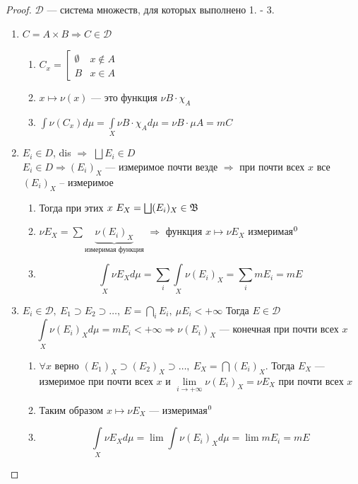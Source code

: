 \documentclass[english]{article}
\theoremstyle{plain}
\theoremstyle{remark}
\theoremstyle{definition}
\begin{document}
\begin{proof}
\(\mathcal{D}\) --- система множеств, для которых выполнено 1. - 3. 
\begin{enumerate}
\item \(C = A\times B \Rightarrow C \in \mathcal{D}\)
\begin{enumerate}
\item \(C_x = \left[\begin{matrix} \emptyset & x \not\in A \\ B & x \in A\end{matrix}\right.\)
\item \(x \mapsto \nu(x)\) --- это функция \(\nu B \cdot \chi_A\)
\item \(\int \nu(C_x) d\mu = \int\limits_X \nu B \cdot \chi_A d\mu = \nu B \cdot \mu A = mC\)
\end{enumerate}
\item \(E_i \in D\), dis \(\Rightarrow\) \(\bigsqcup E_i \in D\) \\
\(E_i \in D \Rightarrow (E_i)_X\) --- измеримое почти везде \(\Rightarrow\) при почти всех \(x\) все \((E_i)_X\) -- измеримое \\
\begin{enumerate}
\item Тогда при этих \(x\ E_X = \bigsqcup(E_i)_X \in \mathfrak{B}\)
\item \(\nu E_X = \sum \underbrace{\nu(E_i)_X}_\text{измеримая функция}\) \(\Rightarrow\) функция \(x \mapsto \nu E_X\) измеримая\(\footnotemark[\value{footnote}]\)
\item \[ \int\limits_X \nu E_X d\mu = \sum_i \int\limits_X \nu(E_i)_X = \sum_i mE_i = mE \]
\end{enumerate}
\item \(E_i \in \mathcal{D},\ E_1 \supset E_2 \supset \dots,\ E = \bigcap\limits_iE_i,\ \mu E_i < + \infty\) Тогда \(E \in \mathcal{D}\)
\[ \int\limits_X \nu(E_i)_X d\mu = mE_i < +\infty \Rightarrow \nu(E_i)_X\text{ --- конечная при почти всех }x \]
\begin{enumerate}
\item \(\forall x\) верно \((E_1)_X \supset (E_2)_X \supset \dots ,\ E_X = \bigcap (E_i)_X\). Тогда \(E_X\) --- измеримое при почти всех \(x\) и \(\lim\limits_{i \to + \infty} \nu(E_i)_X = \nu E_X\) при почти всех \(x\)
\item Таким образом \(x \mapsto \nu E_X\) --- измеримая\(\footnotemark[\value{footnote}]\)
\item \[ \int\limits_X \nu E_X d\mu = \lim \int \nu(E_i)_X d\mu = \lim mE_i = mE \]

\end{enumerate}
\end{enumerate}
\end{proof}
\end{document}
